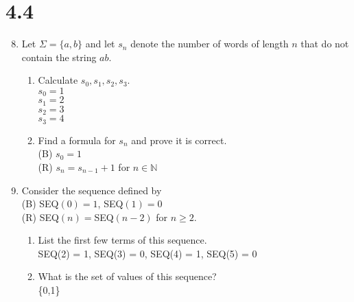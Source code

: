 \documentclass[12pt]{article}
\newcommand{\N}{\mathbb{N}}
\begin{document}
\section*{4.4}
\begin{enumerate}

\setcounter{enumi}{7}
\item Let $\Sigma=\{a,b\}$ and let $s_n$ denote the number of words of length $n$ that do not contain the string $ab$.
	\begin{enumerate}
	\item Calculate $s_0,s_1,s_2,s_3$.\\
	$s_0=1$\\
	$s_1=2$\\
	$s_2=3$\\
	$s_3=4$
	\item Find a formula for $s_n$ and prove it is correct.\\
	(B) $s_0=1$\\
	(R) $s_n=s_{n-1} + 1$ for $n\in\N$
	\end{enumerate}

\setcounter{enumi}{9}
\item Consider the sequence defined by \\
(B) SEQ$(0)=1$, SEQ$(1)=0$\\
(R) SEQ$(n)=$SEQ$(n-2)$ for $n\geq 2$.
	\begin{enumerate}
	\item List the first few terms of this sequence.\\
	SEQ(2) = 1, SEQ(3) = 0, SEQ(4) = 1, SEQ(5) = 0
	\item What is the set of values of this sequence?\\
	\{0,1\}
	\end{enumerate}

\end{enumerate}

\end{document}
